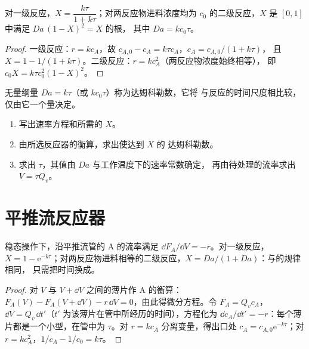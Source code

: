 \begin{theorem}[搅拌釜中的转化率]\label{thm:b2:continuous-reactors:cstr}
对一级反应，$X = \dfrac{k\tau}{1 + k\tau}$；对两反应物进料浓度均为
$c_0$ 的二级反应，$X$ 是 $[0, 1]$ 中满足 $Da\,(1 - X)^2 = X$ 的根，
其中 $Da =
kc_0\tau$。
\end{theorem}

\begin{proof}
一级反应：$r = kc_A$，故 $c_{A,0} - c_A = k\tau c_A$，$c_A = c_{A,0}/(1 + k\tau)$，
且 $X = 1 - 1/(1 + k\tau)$。二级反应：$r = kc_A^2$（两反应物浓度始终相等），
即 $c_0X = k\tau c_0^2(1 - X)^2$。
\end{proof}

无量纲量 $Da = k\tau$（或 $kc_0\tau$）称为达姆科勒数，它将
与反应的时间尺度相比较，
仅由它一个量决定。

\begin{method}[反应器的设计]\label{met:b2:continuous-reactors:size-reactor}
\begin{enumerate}
  \item 写出速率方程和所需的 $X$。
  \item 由所选反应器的衡算，求出使达到 $X$ 的
        达姆科勒数。
  \item 求出 $\tau$，其值由 $Da$ 与工作温度下的速率常数确定，
        再由待处理的流率求出 $V = \tau Q_v$。
\end{enumerate}
\end{method}

\section{平推流反应器}

\begin{theorem}[平推流反应器中的转化率]\label{thm:b2:continuous-reactors:pfr}
稳态操作下，沿平推流管的 A 的流率满足
$\dd F_A/\dd V = -r$。对一级反应，$X = 1 -
\mathrm e^{-k\tau}$；对两反应物进料相等的二级反应，$X =
Da/(1 + Da)$：与的规律相同，
只需把时间换成。
\end{theorem}

\begin{proof}
对 $V$ 与 $V + \dd V$ 之间的薄片作 A 的衡算：$F_A(V) - F_A(V + \dd V)
- r\,\dd V = 0$，由此得微分方程。令 $F_A = Q_vc_A$，
$\dd V = Q_v\,\dd t'$（$t'$ 为该薄片在管中所经历的时间），方程化为
$\dd c_A/\dd t' = -r$：每个薄片都是一个小型，在管中为 $\tau$。对 $r = kc_A$ 分离变量，得出口处 $c_A = c_{A,0}
\mathrm e^{-k\tau}$；对 $r = kc_A^2$，$1/c_A - 1/c_0 = k\tau$。
\end{proof}


